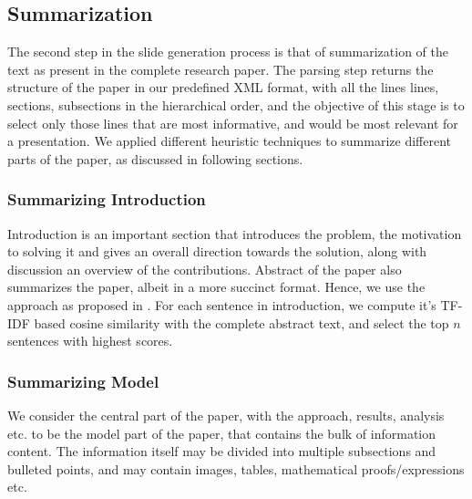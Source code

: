 \subsection{Summarization}

The second step in the slide generation process is that of summarization of the text
as present in the complete research paper. The parsing step returns the structure of
the paper in our predefined XML format, with all the lines lines, sections, subsections
in the hierarchical order, and the objective of this stage is to select only those lines
that are most informative, and would be most relevant for a presentation. We applied 
different heuristic techniques to summarize different parts of the paper, as discussed
in following sections.

\subsubsection{Summarizing Introduction}
Introduction is an important section that introduces the problem, the motivation to solving it
and gives an overall direction towards the solution, along with discussion an overview of
the contributions. Abstract of the paper also summarizes the paper, albeit in a more succinct 
format. Hence, we use the approach as proposed in \cite{sravanthi}. For each sentence 
in introduction, we compute it's TF-IDF based cosine similarity with the complete abstract
text, and select the top $n$ sentences with highest scores.

\subsubsection{Summarizing Model}
We consider the central part of the paper, with the approach, results, analysis etc.
to be the model part of the paper, that contains the bulk of information content.
The information itself may be divided into multiple subsections and bulleted points,
and may contain images, tables, mathematical proofs/expressions etc.


